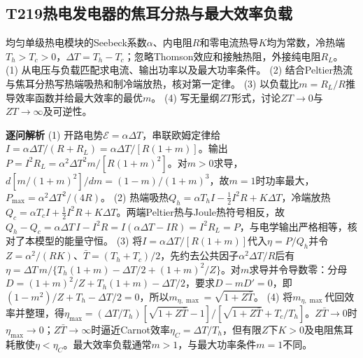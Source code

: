 \subsection*{T219\quad 热电发电器的焦耳分热与最大效率负载}
均匀单级热电模块的Seebeck系数$\alpha$、内电阻$R$和零电流热导$K$均为常数，冷热端$T_h>T_c>0$，$\Delta T=T_h-T_c$；忽略Thomson效应和接触热阻，外接纯电阻$R_L$。
(1) 从电压与负载匹配求电流、输出功率以及最大功率条件。
(2) 结合Peltier热流与焦耳分热写热端吸热和制冷端放热，核对第一定律。
(3) 以负载比$m=R_L/R$推导效率函数并给最大效率的最优$m$。
(4) 写无量纲$ZT$形式，讨论$ZT\to0$与$ZT\to\infty$及可逆性。
\par\textbf{逐问解析}
(1) 开路电势$\mathcal E=\alpha\Delta T$，串联欧姆定律给$I=\alpha\Delta T/(R+R_L)=\alpha\Delta T/[R(1+m)]$。输出$P=I^2R_L=\alpha^2\Delta T^2 m/[R(1+m)^2]$。对$m>0$求导，$d[m/(1+m)^2]/dm=(1-m)/(1+m)^3$，故$m=1$时功率最大，$P_{\max}=\alpha^2\Delta T^2/(4R)$。
(2) 热端吸热$Q_h=\alpha T_h I-\tfrac12I^2R+K\Delta T$，冷端放热$Q_c=\alpha T_c I+\tfrac12I^2R+K\Delta T$。两端Peltier热与Joule热符号相反，故$Q_h-Q_c=\alpha\Delta T\,I-I^2R=I(\alpha\Delta T-IR)=I^2R_L=P$，与电学输出严格相等，核对了本模型的能量守恒。
(3) 将$I=\alpha\Delta T/[R(1+m)]$代入$\eta=P/Q_h$并令$Z=\alpha^2/(RK)$、$\bar T=(T_h+T_c)/2$，先约去公共因子$\alpha^2\Delta T/R$后有$\eta=\Delta T\,m/\{T_h(1+m)-\Delta T/2+(1+m)^2/Z\}$。对$m$求导并令导数零：分母$D=(1+m)^2/Z+T_h(1+m)-\Delta T/2$，要求$D-mD'=0$，即$(1-m^2)/Z+T_h-\Delta T/2=0$，所以$m_{\eta,\max}=\sqrt{1+Z\bar T}$。
(4) 将$m_{\eta,\max}$代回效率并整理，得$\eta_{\max}=(\Delta T/T_h)[\sqrt{1+Z\bar T}-1]/[\sqrt{1+Z\bar T}+T_c/T_h]$。$Z\bar T\to0$时$\eta_{\max}\to0$；$Z\bar T\to\infty$时逼近Carnot效率$\eta_C=\Delta T/T_h$，但有限$Z$下$K>0$及电阻焦耳耗散使$\eta<\eta_C$。最大效率负载通常$m>1$，与最大功率条件$m=1$不同。
\par\medskip
